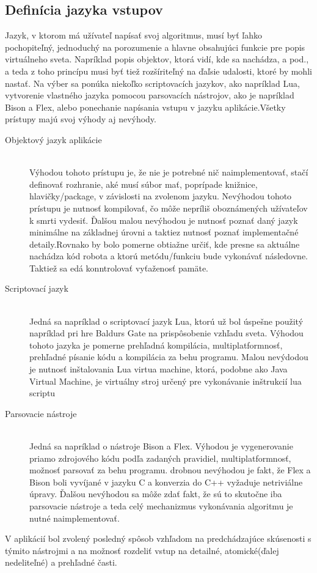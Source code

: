 \subsection{ Definícia jazyka vstupov }
Jazyk, v ktorom má užívateľ napísať svoj algoritmus, musí byť ľahko pochopiteľný, jednoduchý na porozumenie a hlavne obsahujúci funkcie pre popis virtuálneho sveta. Napríklad popis objektov, ktorá vidí, kde sa nachádza, a pod., a teda z toho princípu musi byť tiež rozšíriteľný na ďaľsie udalosti, ktoré by mohli nastať. Na výber sa ponúka niekoľko scriptovacích jazykov, ako napríklad Lua, vytvorenie vlastného jazyka pomocou parsovacích nástrojov, ako je napríklad Bison a Flex, alebo ponechanie napísania vstupu v jazyku aplikácie.Všetky prístupy majú svoj výhody aj nevýhody.
\begin{description}
	\item[Objektový jazyk aplikácie]\hfill \\ Výhodou tohoto prístupu je, že nie je potrebné nič naimplementovať, stačí definovať rozhranie, aké musí súbor mať, poprípade knižnice, hlavičky/package, v závislosti na zvolenom jazyku. Nevýhodou tohoto prístupu je nutnosť kompilovať, čo môže nepríliš oboznámených užívateľov k smrti vydesiť. Ďalšou malou nevýhodou je nutnosť poznať daný jazyk minimálne na základnej úrovni a taktiez nutnosť poznať implementačné detaily.Rovnako by bolo pomerne obtiažne určiť, kde presne sa aktuálne nachádza kód robota a ktorú metódu/funkciu bude vykonávať následovne. Taktiež sa edá konntrolovať vyťaženosť pamäte.
	\item[Scriptovací jazyk]\hfill \\ Jedná sa napríklad o scriptovací jazyk Lua, ktorú už bol úspešne použitý napríklad pri hre Baldurs Gate na prispôsobenie vzhľadu sveta. Výhodou tohoto jazyka je pomerne prehľadná kompilácia, multiplatformnosť, prehľadné písanie kódu a kompilácia za behu programu. Malou nevýdodou je nutnosť inštalovania Lua virtua machine, ktorá, podobne ako Java Virtual Machine, je virtuálny stroj určený pre vykonávanie inštrukcií lua scriptu
	\item[Parsovacie nástroje]\hfill \\ Jedná sa napríklad o nástroje Bison a Flex. Výhodou je vygenerovanie priamo zdrojového kódu podľa zadaných pravidiel, multiplatformnosť, možnosť parsovať za behu programu. drobnou nevýhodou je fakt, že Flex a Bison boli vyvíjané v jazyku C a konverzia do C++ vyžaduje netriviálne úpravy. Ďalšou nevýhodou sa môže zdať fakt, že sú to skutočne iba parsovacie nástroje a teda celý mechanizmus vykonávania algoritmu je nutné naimplementovať.
\end{description}
V aplikácií bol zvolený posledný spôsob vzhľadom na predchádzajúce skúsenosti s týmito nástrojmi a na možnosť rozdeliť vstup na detailné, atomické(ďalej nedeliteľné) a prehľadné časti.

